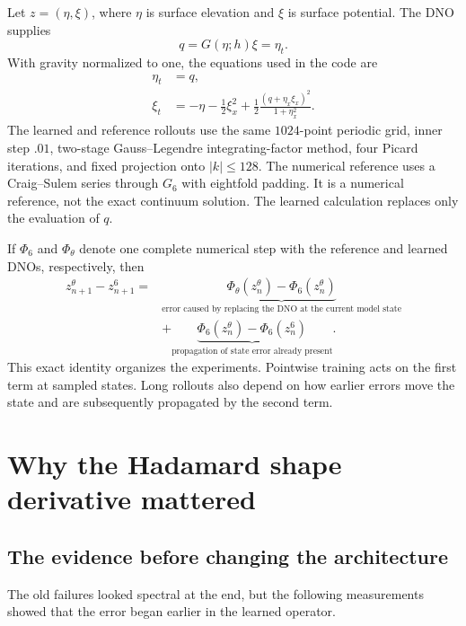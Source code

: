 \documentclass[11pt]{article}
\begin{document}
Let $z=(\eta,\xi)$, where $\eta$ is surface elevation and $\xi$ is surface
potential.  The DNO supplies
\begin{equation}
  q=G(\eta;h)\xi=\eta_t.
  \label{eq:q}
\end{equation}
With gravity normalized to one, the equations used in the code are
\begin{align}
  \eta_t&=q,\\
  \xi_t&=-\eta-\frac12\xi_x^2
  +\frac12\frac{(q+\eta_x\xi_x)^2}{1+\eta_x^2}.
  \label{eq:zakharov}
\end{align}
The learned and reference rollouts use the same $1024$-point periodic grid,
inner step $.01$, two-stage Gauss--Legendre integrating-factor method, four
Picard iterations, and fixed projection onto $|k|\leq128$.  The numerical
reference uses a Craig--Sulem series through $G_6$ with eightfold padding.  It
is a numerical reference, not the exact continuum solution.  The learned
calculation replaces only the evaluation of $q$.

If $\Phi_6$ and $\Phi_\theta$ denote one complete numerical step with the
reference and learned DNOs, respectively, then
\begin{equation}
\begin{split}
z_{n+1}^\theta-z_{n+1}^6
={}&\underbrace{\Phi_\theta(z_n^\theta)-\Phi_6(z_n^\theta)}_{
\text{error caused by replacing the DNO at the current model state}}\\
&+\underbrace{\Phi_6(z_n^\theta)-\Phi_6(z_n^6)}_{
\text{propagation of state error already present}}.
\end{split}
\label{eq:split}
\end{equation}
This exact identity organizes the experiments.  Pointwise training acts on the
first term at sampled states.  Long rollouts also depend on how earlier errors
move the state and are subsequently propagated by the second term.

\section{Why the Hadamard shape derivative mattered}

\subsection{The evidence before changing the architecture}

The old failures looked spectral at the end, but the following measurements
showed that the error began earlier in the learned operator.
\end{document}
